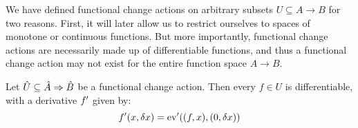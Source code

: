 We have defined functional change actions on arbitrary subsets $U \subseteq A \rightarrow B$ for two
reasons. First, it will later allow us to restrict ourselves to spaces of monotone or continuous
functions. But more importantly, functional change actions are necessarily made up of differentiable
functions, and thus a functional change action may not exist for the entire function space
$A \rightarrow B$.

\begin{prop}
  \label{prop:differentiableFunctionalChanges}
  Let $\cstr{U} \subseteq \cstr{A} \Rightarrow \cstr{B}$ be a functional change action. Then every 
  $f \in U$ is differentiable, with a derivative $f'$ given by:
  \begin{displaymath}
    f'(x, \delta x) = \operatorname{ev}'((f, x), (0, \delta x))
  \end{displaymath}
\end{prop}

\iffalse
Conversely, the derivative of the evaluation map can also be used to compute the effect of a given
function change $\delta f$:
\begin{prop}
  Let $\cstr{U} \subseteq \cstr{A} \Rightarrow \cstr{B}$. Then for every $f \in U$ and $\delta f \in \changes U$
  we have:
  \begin{displaymath}
    (f \cplus \delta f)(x) = f(x) \cplus \ev'((f, x), (\delta f, 0))
  \end{displaymath}
\end{prop}

\begin{prop}
  Let $\cstr{A}$ and $\cstr{B}$ be change actions and $\cstr{U} \subseteq \cstr{A} \Rightarrow \cstr{B}$
  a functional change action. First, we note that the set $U \times A \rightarrow \changes{B}$ is
  a monoid with addition $+_\Rightarrow$ and neutral element $0_\Rightarrow$ defined by:
  \begin{align*}
    (\upsilon f +_\Rightarrow \upsilon g)(h, x) 
    &\defeq \upsilon f (h, x) \cplus \upsilon g((\lambda x . \upsilon f (h, x)) , x)
  \end{align*}

  Every functional change action $\cstr{U} \subseteq \cstr{A} \Rightarrow \cstr{B}$ is equivalent to
  a (functional) change action of the form $(U, W, \cplus_\Rightarrow)$ where:
  \begin{itemize}
  \item $W$ is the monoid generated by $V$ and $+_\Rightarrow$, where $V$ is defined as:
    \begin{gather*}
      V \subseteq U \times A \rightarrow \changes{B}\\
      V \defeq \{~
          \lambda f. \lambda x. \ev'((f, x), (\delta f, 0)) ~|~ \delta f \in \changes U
          ~\}\\
      (f \cplus_\Rightarrow \upsilon f)(x) \defeq f(x) \cplus \upsilon f(f, x)
    \end{gather*}
  \end{itemize}
\end{prop}
\fi

